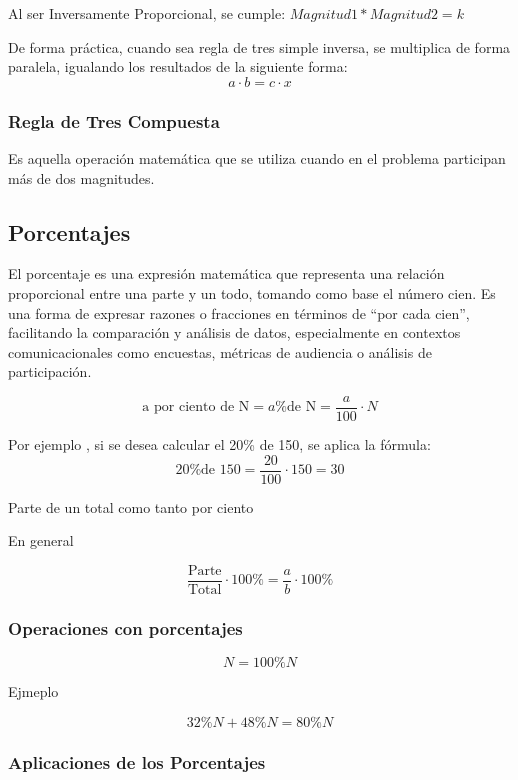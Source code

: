 \documentclass[
  stu,
  floatsintext,
  longtable,
  a4paper,
  nolmodern,
  notxfonts,
  notimes,
  colorlinks=true,linkcolor=blue,citecolor=blue,urlcolor=blue]{apa7}
\begin{document}
Al ser Inversamente Proporcional, se cumple:
\(Magnitud 1 * Magnitud 2 = k\)

De forma práctica, cuando sea regla de tres simple inversa, se
multiplica de forma paralela, igualando los resultados de la siguiente
forma: \[
a \cdot b = c \cdot x
\]

\subsubsection{Regla de Tres Compuesta}\label{regla-de-tres-compuesta}

Es aquella operación matemática que se utiliza cuando en el problema
participan más de dos magnitudes.

\subsection{Porcentajes}\label{porcentajes}

El porcentaje es una expresión matemática que representa una relación
proporcional entre una parte y un todo, tomando como base el número
cien. Es una forma de expresar razones o fracciones en términos de ``por
cada cien'', facilitando la comparación y análisis de datos,
especialmente en contextos comunicacionales como encuestas, métricas de
audiencia o análisis de participación.

\[
\text{a por ciento de N} = a \% \text{de N} = \frac{a}{100} \cdot N
\]

Por ejemplo , si se desea calcular el 20\% de 150, se aplica la fórmula:
\[
\text{20\% de 150} = \frac{20}{100} \cdot 150 = 30
\]

Parte de un total como tanto por ciento

En general

\[
\frac{\text{Parte}}{\text{Total}} \cdot 100 \% = \frac{a}{b} \cdot 100 \%
\]

\subsubsection{Operaciones con
porcentajes}\label{operaciones-con-porcentajes}

\[
N = 100 \% N
\]

Ejmeplo

\[
32\%N + 48\%N = 80\%N
\]

\subsubsection{Aplicaciones de los
Porcentajes}\label{aplicaciones-de-los-porcentajes}
\end{document}
